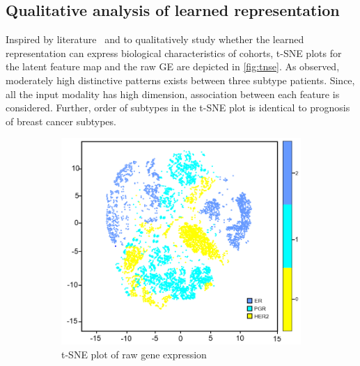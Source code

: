 \subsection{Qualitative analysis of learned representation}
Inspired by literature~\cite{rhee2017hybrid} and to qualitatively study whether the learned representation can express biological characteristics of cohorts, t-SNE plots for the latent feature map and the raw GE are depicted in \cref{fig:tnse}. As observed, moderately high distinctive patterns exists between three subtype patients. Since, all the input modality has high dimension, association between each feature is considered. Further, order of subtypes in the t-SNE plot is identical to prognosis of breast cancer subtypes. 

\begin{figure}
	\centering
	\begin{subfigure}{.48\linewidth}
		\centering
		\includegraphics[scale=0.7]{images/raw_tsne.png}
		\caption{t-SNE plot of raw gene expression}
        \label{fig:tsne_raw}
	\end{subfigure}
	\begin{subfigure}{0.48\linewidth}
		\centering

\end{subfigure}
\end{figure}
